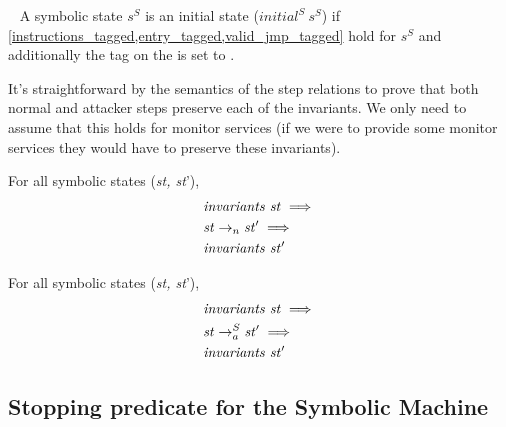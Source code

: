 \begin{definition}\label{symbolic_initial_pred}
  ~ A symbolic state $s^S$ is an initial state ($initial^S ~ s^S$)
  if \cref{instructions_tagged,entry_tagged,valid_jmp_tagged} hold for $s^S$
  and additionally the tag on the \pc is set to \DATAname.
\end{definition}



It's straightforward by the semantics of the step relations to prove
that both normal and attacker steps preserve each of the invariants.
We only need to assume that this holds for monitor services (\IE if we
were to provide some monitor services they would have to preserve
these invariants).


\begin{lemma}
\label{step_preserves_invariants}
For all symbolic states (\textit{st, st}'),
\begin{align*}
  & \mathit{invariants}~\mathit{st} \implies \\
  & \stepn{\mathit{st}}{\mathit{st}'} \implies \\
  & \mathit{invariants}~\mathit{st}'
\end{align*}
\end{lemma}

\begin{lemma}
\label{step_a_preserves_invariants}
For all symbolic states (\textit{st, st}'),
\begin{align*}
  & \mathit{invariants}~\mathit{st} \implies \\
  & \stepa{\mathit{st}}{\mathit{st}'}{S} \implies \\
  & \mathit{invariants}~\mathit{st}'
\end{align*}
\end{lemma}

\subsection{Stopping predicate for the Symbolic Machine}
\label{sec:symbolic_stopping}

